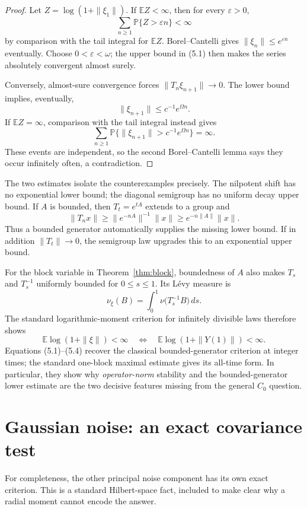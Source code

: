 \documentclass[11pt]{article}
\theoremstyle{remark}
\newcommand{\E}{\mathbb E}
\newcommand{\Pp}{\mathbb P}
\begin{document}
\begin{proof}
Let $Z=\log(1+\|\xi_1\|)$.  If $\E Z<\infty$, then for every
$\varepsilon>0$,
\[
 \sum_{n\geq1}\Pp\{Z>\varepsilon n\}<\infty
\]
by comparison with the tail integral for $\E Z$.  Borel--Cantelli gives
$\|\xi_n\|\leq e^{\varepsilon n}$ eventually.  Choose
$0<\varepsilon<\omega$; the upper bound in (5.1) then makes the series
absolutely convergent almost surely.

Conversely, almost-sure convergence forces
$\|T_n\xi_{n+1}\|\to0$.  The lower bound implies, eventually,
\[
 \|\xi_{n+1}\|\leq c^{-1}e^{\Omega n}.
\]
If $\E Z=\infty$, comparison with the tail integral instead gives
\[
 \sum_{n\geq1}
 \Pp\{\|\xi_{n+1}\|>c^{-1}e^{\Omega n}\}=\infty.
\]
These events are independent, so the second Borel--Cantelli lemma says they
occur infinitely often, a contradiction.
\end{proof}

The two estimates isolate the counterexamples precisely.  The nilpotent
shift has no exponential lower bound; the diagonal semigroup has no uniform
decay upper bound.  If $A$ is bounded, then $T_t=e^{tA}$ extends to a group and
\[
 \|T_nx\|\geq\|e^{-nA}\|^{-1}\|x\|
 \geq e^{-n\|A\|}\|x\|.                             \tag{5.3}
\]
Thus a bounded generator automatically supplies the missing lower bound.  If
in addition $\|T_t\|\to0$, the semigroup law upgrades this to an exponential
upper bound.

For the block variable in Theorem~\ref{thm:block}, boundedness of $A$ also
makes $T_s$ and $T_s^{-1}$ uniformly bounded for $0\leq s\leq1$.  Its L\'evy
measure is
\[
 \nu_\xi(B)=\int_0^1\nu\bigl(T_s^{-1}B\bigr)\,ds.
\]
The standard logarithmic-moment criterion for infinitely divisible laws
therefore shows
\[
 \E\log(1+\|\xi\|)<\infty
 \quad\Longleftrightarrow\quad
 \E\log(1+\|Y(1)\|)<\infty.                         \tag{5.4}
\]
Equations (5.1)--(5.4) recover the classical bounded-generator criterion at
integer times; the standard one-block maximal estimate gives its all-time
form.  In particular, they show why \emph{operator-norm} stability and the
bounded-generator lower estimate are the two decisive features missing from
the general $C_0$ question.

\section{Gaussian noise: an exact covariance test}

For completeness, the other principal noise component has its own exact
criterion.  This is a standard Hilbert-space fact, included to make clear why
a radial moment cannot encode the answer.
\end{document}
